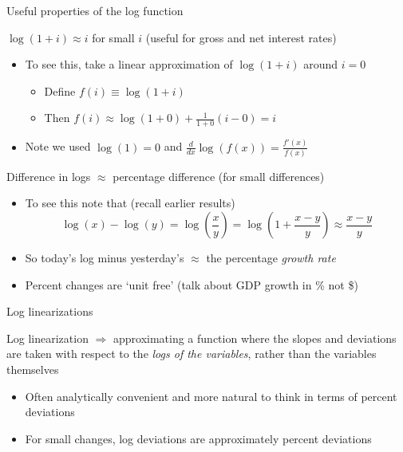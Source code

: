 

\begin{frame}{Useful properties of the log function}

$\log{(1+i)} \approx i$ for small $i$ (useful for gross and net interest rates)
\begin{itemize}
\item	To see this, take a linear approximation of $\log{(1+i)}$ around $i=0$
	\begin{itemize}
	\item	Define $f(i) \equiv \log{(1+i)}$
	\item	Then $f(i) \approx \log{(1+0)} + \frac{1}{1+0}(i-0)=i$
	\end{itemize}
\item	Note we used $\log{(1)} = 0$ and $\frac{d}{dx} \log{(f(x))} = \frac{f'(x)}{f(x)}$
\end{itemize}

\vspace{3mm}
Difference in logs $\approx$ percentage difference (for small differences)
\begin{itemize}
\item	To see this note that (recall earlier results)
\[
\log{(x)} - \log{(y)} = \log{\left( \frac{x}{y} \right)} =  \log{\left( 1 + \frac{x-y}{y} \right)} \approx \frac{x-y}{y}
\]
\item	So today's log minus yesterday's $\approx$ the percentage \emph{growth rate}
\item	Percent changes are `unit free' (talk about GDP growth in \% not \$)
\end{itemize}

\end{frame}



\begin{frame}{Log linearizations}

Log linearization $\Rightarrow$ approximating a function where the slopes and deviations are taken with respect to the \emph{logs of the variables}, rather than the variables themselves
\begin{itemize}
\item	Often analytically convenient and more natural to think in terms of percent deviations
\item	For small changes, log deviations are approximately percent deviations
\end{itemize}

\end{frame}

